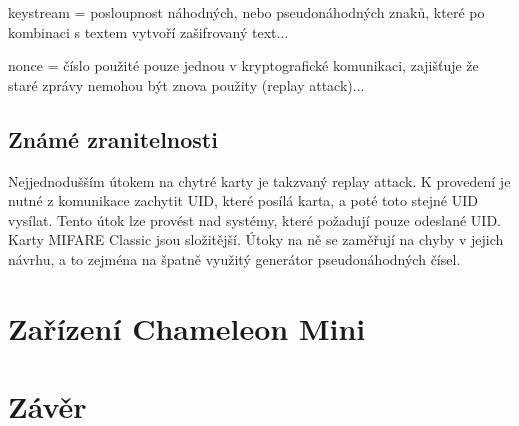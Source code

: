 keystream = posloupnost náhodných, nebo pseudonáhodných znaků, které po kombinaci s textem vytvoří zašifrovaný text...

nonce = číslo použité pouze jednou v kryptografické komunikaci, zajišťuje že staré zprávy nemohou být znova použity (replay attack)...

\section{Známé zranitelnosti}
Nejjednodušším útokem na chytré karty je takzvaný replay attack. K provedení je nutné z komunikace zachytit UID, které posílá karta, a poté toto stejné UID vysílat. Tento útok lze provést nad systémy, které požadují pouze odeslané UID. Karty MIFARE Classic jsou složitější. Útoky na ně se zaměřují na chyby v jejich návrhu, a to zejména na špatně využitý generátor pseudonáhodných čísel\cite{Mifare_Classic_story}. 
\par





\chapter{Zařízení Chameleon Mini}
\label{zarizeni_chameleon_mini}







\chapter{Závěr}
\label{zaver}


